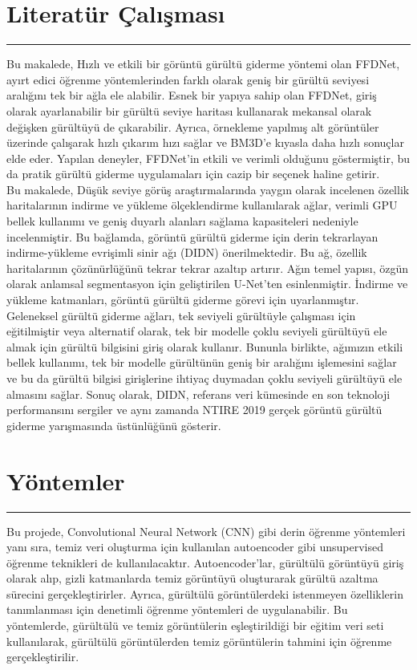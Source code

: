 \documentclass{article}
\begin{document}
\section{Literatür Çalışması}
\rule{\textwidth}{0.5pt}

 \noindent Bu makalede\cite{zhang2018ffdnet}, Hızlı ve etkili bir görüntü gürültü giderme yöntemi olan FFDNet, ayırt edici öğrenme yöntemlerinden farklı olarak geniş bir gürültü seviyesi aralığını tek bir ağla ele alabilir. Esnek bir yapıya sahip olan FFDNet, giriş olarak ayarlanabilir bir gürültü seviye haritası kullanarak mekansal olarak değişken gürültüyü de çıkarabilir. Ayrıca, örnekleme yapılmış alt görüntüler üzerinde çalışarak hızlı çıkarım hızı sağlar ve BM3D'e kıyasla daha hızlı sonuçlar elde eder. Yapılan deneyler, FFDNet'in etkili ve verimli olduğunu göstermiştir, bu da pratik gürültü giderme uygulamaları için cazip bir seçenek haline getirir.\\[10pt]

 \noindent Bu makalede\cite{yu2019deep}, Düşük seviye görüş araştırmalarında yaygın olarak incelenen özellik haritalarının indirme ve yükleme ölçeklendirme kullanılarak ağlar, verimli GPU bellek kullanımı ve geniş duyarlı alanları sağlama kapasiteleri nedeniyle incelenmiştir. Bu bağlamda, görüntü gürültü giderme için derin tekrarlayan indirme-yükleme evrişimli sinir ağı (DIDN) önerilmektedir. Bu ağ, özellik haritalarının çözünürlüğünü tekrar tekrar azaltıp artırır. Ağın temel yapısı, özgün olarak anlamsal segmentasyon için geliştirilen U-Net'ten esinlenmiştir. İndirme ve yükleme katmanları, görüntü gürültü giderme görevi için uyarlanmıştır. Geleneksel gürültü giderme ağları, tek seviyeli gürültüyle çalışması için eğitilmiştir veya alternatif olarak, tek bir modelle çoklu seviyeli gürültüyü ele almak için gürültü bilgisini giriş olarak kullanır. Bununla birlikte, ağımızın etkili bellek kullanımı, tek bir modelle gürültünün geniş bir aralığını işlemesini sağlar ve bu da gürültü bilgisi girişlerine ihtiyaç duymadan çoklu seviyeli gürültüyü ele almasını sağlar. Sonuç olarak, DIDN, referans veri kümesinde en son teknoloji performansını sergiler ve aynı zamanda NTIRE 2019 gerçek görüntü gürültü giderme yarışmasında üstünlüğünü gösterir.\\[10pt]




\newline
\noindent
\section{Yöntemler}
\rule{\textwidth}{0.5pt}
Bu projede, Convolutional Neural Network (CNN) gibi derin öğrenme yöntemleri yanı sıra, temiz veri oluşturma için kullanılan autoencoder gibi unsupervised öğrenme teknikleri de kullanılacaktır. Autoencoder'lar, gürültülü görüntüyü giriş olarak alıp, gizli katmanlarda temiz görüntüyü oluşturarak gürültü azaltma sürecini gerçekleştirirler. Ayrıca, gürültülü görüntülerdeki istenmeyen özelliklerin tanımlanması için denetimli öğrenme yöntemleri de uygulanabilir. Bu yöntemlerde, gürültülü ve temiz görüntülerin eşleştirildiği bir eğitim veri seti kullanılarak, gürültülü görüntülerden temiz görüntülerin tahmini için öğrenme gerçekleştirilir.\\[10pt]
\end{document}
